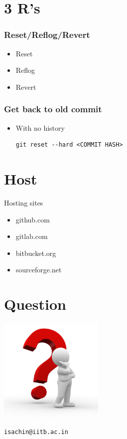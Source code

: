 \documentclass[bigger, presentation]{beamer}
\begin{document}
\section{3 R's}
\label{sec-5}
\begin{frame}
\frametitle{Reset/Reflog/Revert}
\label{sec-5-1}

 
\begin{itemize}
\item Reset
\item Reflog
\item Revert
\end{itemize}
\end{frame}
\begin{frame}[fragile]
\frametitle{Get back to old commit}
\label{sec-5-2}
\begin{itemize}

\item With no history\\
\label{sec-5-2-1}%
\begin{verbatim}
git reset --hard <COMMIT HASH>
\end{verbatim}

\end{itemize} %
\end{frame}
\section{Host}
\label{sec-6}
\begin{frame}
\begin{block}{Hosting sites}
\label{sec-6-1-1}

\begin{itemize}
\item github.com
\item gitlab.com
\item bitbucket.org
\item sourceforge.net
\end{itemize}
     
\end{block}
\end{frame}
\section{Question}
\label{sec-7}
\begin{frame}[fragile]

   \includegraphics[width=5cm,angle=0]{./questions.png}
   

\begin{verbatim}
isachin@iitb.ac.in
\end{verbatim}
\end{frame}
\end{document}
